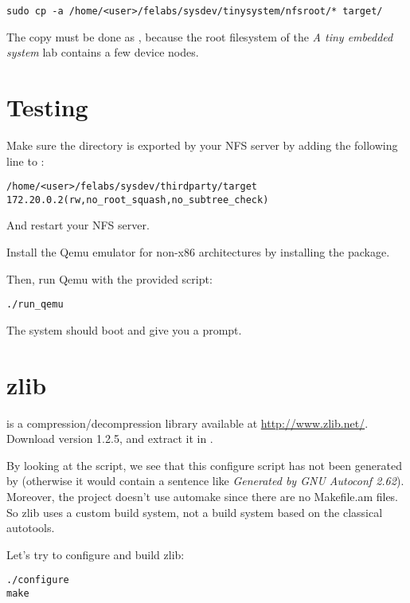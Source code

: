 \begin{verbatim}
sudo cp -a /home/<user>/felabs/sysdev/tinysystem/nfsroot/* target/
\end{verbatim}

The copy must be done as , because the root filesystem of
the {\em A tiny embedded system} lab contains a few device nodes.

\section{Testing}

Make sure the  directory is exported by your NFS server
by adding the following line to :

\scriptsize
\begin{verbatim}
/home/<user>/felabs/sysdev/thirdparty/target 172.20.0.2(rw,no_root_squash,no_subtree_check)
\end{verbatim}
\normalsize

And restart your NFS server.

Install the Qemu emulator for non-x86 architectures by installing the
 package.

Then, run Qemu with the provided script:

\begin{verbatim}
./run_qemu
\end{verbatim}

The system should boot and give you a prompt.

\section{zlib}

 is a compression/decompression library available at
\url{http://www.zlib.net/}. Download version 1.2.5, and extract it in
.

By looking at the  script, we see that this configure
script has not been generated by  (otherwise it would
contain a sentence like {\em Generated by GNU Autoconf
  2.62}). Moreover, the project doesn't use automake since there are
no Makefile.am files. So zlib uses a custom build system, not a build
system based on the classical autotools.

Let's try to configure and build zlib:

\begin{verbatim}
./configure
make
\end{verbatim}

